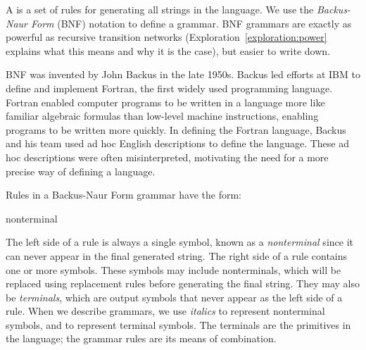 A  is a set of rules for generating all strings in the language.  We use the {\em Backus-Naur Form} (BNF) notation to define a grammar.  BNF grammars are exactly as powerful as recursive transition networks (Exploration~\ref{exploration:power} explains what this means and why it is the case), but easier to write down.

BNF was invented by John Backus in the late 1950s.  
Backus led efforts at IBM to define and implement Fortran, the first widely used programming language.  
Fortran enabled computer programs to be written in a language more like familiar algebraic formulas than low-level machine instructions, enabling programs to be written more quickly.  In defining the Fortran language, Backus and his team used ad hoc English descriptions to define the language.  
These ad hoc descriptions were often misinterpreted, motivating the need for a more precise way of defining a language.  


Rules in a Backus-Naur Form grammar have the form:
\begin{bnfgrammarmc}{nonterminal}
\end{bnfgrammarmc}
The left side of a rule is always a single symbol, known as a \emph{nonterminal} since it can never appear in the final generated string.  The right side of a rule contains one or more symbols.  
These symbols may include nonterminals, which will be replaced using replacement rules before generating the final string.  They may also be {\em terminals}, which are output symbols that never appear as the left side of a rule.  When we describe grammars, we use {\em italics} to represent nonterminal symbols, and  to represent terminal symbols.  The terminals are the primitives in the language; the grammar rules are its means of combination.

